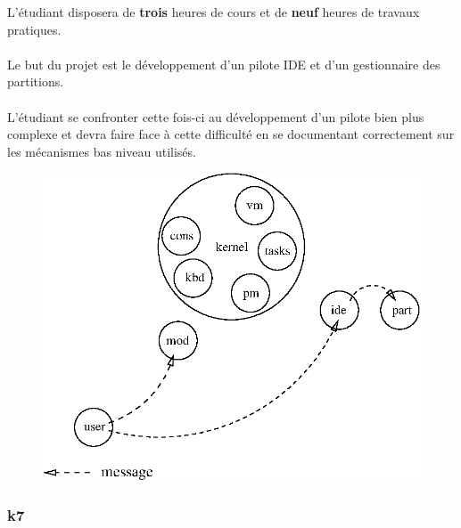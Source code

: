 \documentclass[10pt,a4wide]{article}
\begin{document}
L'\'etudiant disposera de \textbf{trois} heures de cours et de \textbf{neuf}
heures de travaux pratiques.

\paragraph{}

Le but du projet est le d\'eveloppement d'un pilote IDE et d'un
gestionnaire des partitions.

\paragraph{}

L'\'etudiant se confronter cette fois-ci au d\'eveloppement d'un pilote
bien plus complexe et devra faire face \`a cette difficult\'e en se
documentant correctement sur les m\'ecanismes bas niveau utilis\'es.

\vspace{5cm}

\begin{figure}[h]
\centerline{\includegraphics{figures/k6.eps}}
\end{figure}

\newpage

\subsubsection{k7}

\paragraph{}
\end{document}
